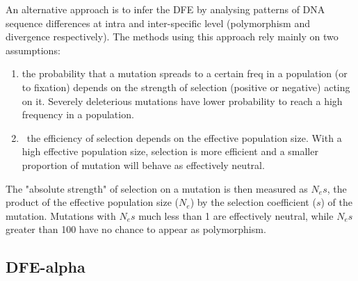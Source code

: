 An alternative approach is to infer the DFE by analysing patterns of DNA sequence differences at intra and inter-specific level (polymorphism and divergence respectively).
The methods using this approach rely mainly on two assumptions:
\begin{enumerate}
\item  the probability that a mutation spreads to a certain freq in a population (or to fixation) depends on the strength of selection (positive or negative) acting on it.
Severely deleterious mutations have lower probability to reach a high frequency in a population.
\item\ the efficiency of selection depends on the effective population size. 
With a high effective population size, selection is more efficient and a smaller proportion of mutation will behave as effectively neutral.
\end{enumerate}
%
The "absolute strength" of selection on a mutation is then measured as $N_{e}s$, the product of the effective population size ($N_{e}$)
by the selection coefficient ($s$)
of the mutation. Mutations with $N_{e}s$ much less than 1 are effectively neutral, while $N_{e}s$ greater than 100 have no chance to appear as polymorphism.

\subsection{DFE-alpha} \label{alpha}

